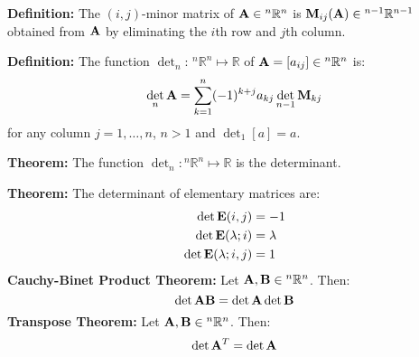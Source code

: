 \documentclass{article}
\begin{document}
\begin{minipage}[t]{0.45\linewidth}
        \textbf{Definition:} The $(i,j)$-minor matrix of $\mathbf{A} \in {^n}\mathbb{R}^n$ is $\mathbf{M}_{ij}(\mathbf{A}) \in {^{n-1}}\mathbb{R}^{n-1}$ obtained from $\mathbf{A}$ by eliminating the $i$th row and $j$th column.
        \vspace{2mm}

        \textbf{Definition:} The function $\det_n:\, {^n}\mathbb{R}^n \mapsto \mathbb{R}$ of $\mathbf{A} = [a_{ij}] \in {^n}\mathbb{R}^n$ is:
        \begin{equation*}
            \det_n \mathbf{A} = \sum_{k=1}^n (-1)^{k+j}a_{kj}\det_{n-1}\mathbf{M}_{kj}
        \end{equation*}
        for any column $j=1,\dots,n$, $n>1$ and $\det_1[a]=a$.
        \vspace{2mm}

        \textbf{Theorem:} The function $\det_n: {^n}\mathbb{R}^n \mapsto \mathbb{R}$ is the determinant.
        \vspace{2mm}

        \textbf{Theorem:} The determinant of elementary matrices are:
        \begin{align*}
            \det \mathbf{E}(i,j) &= -1 \\ 
            \det \mathbf{E}(\lambda;i) &= \lambda \\ 
            \det \mathbf{E}(\lambda; i,j) &= 1 
        \end{align*}
        \textbf{Cauchy-Binet Product Theorem:} Let $\mathbf{A},\mathbf{B} \in {^n}\mathbb{R}^n$. Then:
        \begin{equation*}
            \det \mathbf{AB} = \det \mathbf{A} \det\mathbf{B}
        \end{equation*}
        \textbf{Transpose Theorem:}  Let $\mathbf{A},\mathbf{B} \in {^n}\mathbb{R}^n$. Then:
        \begin{equation*}
            \det \mathbf{A}^T = \det \mathbf{A}
        \end{equation*}
    \end{minipage}\hfill
\end{document}
